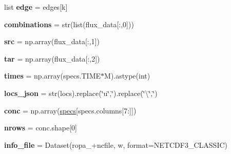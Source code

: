 \begin{DoxyCompactItemize}
list {\bfseries edge} = edges\mbox{[}k\mbox{]}
\item 
\mbox{\label{namespaceropa__tool_aa079aa5a045d7c10dd2433d920785679}} 
{\bfseries combinations} = str(list(flux\+\_\+data\mbox{[}\+:,0\mbox{]}))
\item 
\mbox{\label{namespaceropa__tool_ad7bd41ae6cc3e6d21f6b2729a5e8b8ea}} 
{\bfseries src} = np.\+array(flux\+\_\+data\mbox{[}\+:,1\mbox{]})
\item 
\mbox{\label{namespaceropa__tool_aee9e21562693c655b9082d19402a2d77}} 
{\bfseries tar} = np.\+array(flux\+\_\+data\mbox{[}\+:,2\mbox{]})
\item 
\mbox{\label{namespaceropa__tool_a08a4d01c579e77e0256f5c06b128a846}} 
{\bfseries times} = np.\+array(specs.\+T\+I\+ME$\ast$M).astype(int)
\item 
\mbox{\label{namespaceropa__tool_aff0fcebbb7aa553896c572d253f2a160}} 
{\bfseries locs\+\_\+json} = str(locs).replace(\char`\"{}u\textquotesingle{}\char`\"{},\textquotesingle{}\char`\"{}\textquotesingle{}).replace(\char`\"{}\textbackslash{}\textquotesingle{}\char`\"{},\textquotesingle{}\char`\"{}\textquotesingle{})
\item 
\mbox{\label{namespaceropa__tool_a13298c41f1bbd40f84f1b131f11cf1c5}} 
{\bfseries conc} = np.\+array(\mbox{\hyperlink{namespaceropa__tool_aa744f70435f5581e7e9d31783776f50c}{specs}}\mbox{[}specs.\+columns\mbox{[}7\+:\mbox{]}\mbox{]})
\item 
\mbox{\label{namespaceropa__tool_a733dc75004917e063d8dd2803c00fcde}} 
{\bfseries nrows} = conc.\+shape\mbox{[}0\mbox{]}
\item 
\mbox{\label{namespaceropa__tool_af8e2b6cf149b71980dee7095eb2b49f8}} 
{\bfseries info\+\_\+file} = Dataset(\textquotesingle{}ropa\+\_\+\textquotesingle{}+ncfile, \textquotesingle{}w\textquotesingle{}, format=\textquotesingle{}N\+E\+T\+C\+D\+F3\+\_\+\+C\+L\+A\+S\+S\+IC\textquotesingle{})
\item 
\mbox{\label{namespaceropa__tool_ac3f8d08f8ead17c0298df874d9c949c6}} 

\end{DoxyCompactItemize}
